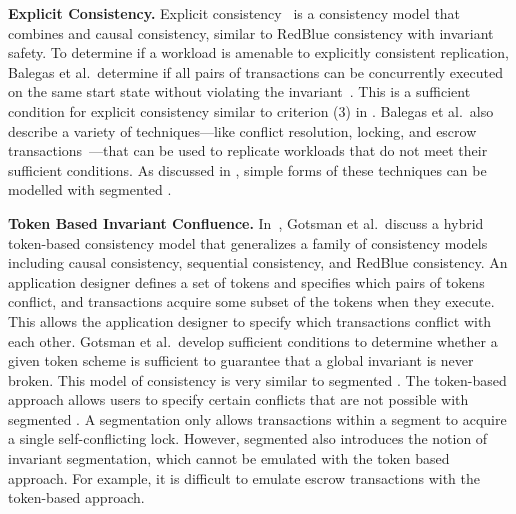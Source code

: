 \textbf{Explicit Consistency.}
Explicit consistency~\cite{balegas2015towards} is a consistency model that
combines \invariantconfluence{} and causal consistency, similar to RedBlue
consistency with invariant safety. To determine if a workload is amenable to
explicitly consistent replication, Balegas et al.\ determine if all pairs of
transactions can be concurrently executed on the same start state without
violating the invariant~\cite{balegas2015towards}.  This is a sufficient
condition for explicit consistency similar to criterion (3) in
. Balegas et al.\ also describe a variety of
techniques---like conflict resolution, locking, and escrow
transactions~\cite{o1986escrow}---that can be used to replicate workloads that
do not meet their sufficient conditions. As discussed in ,
simple forms of these techniques can be modelled with segmented
\invariantconfluence{}.

\textbf{Token Based Invariant Confluence.}
In~\cite{gotsman2016cause}, Gotsman et al.\ discuss a hybrid token-based
consistency model that generalizes a family of consistency models including
causal consistency, sequential consistency, and RedBlue consistency. An
application designer defines a set of tokens and specifies which pairs of
tokens conflict, and transactions acquire some subset of the tokens when they
execute. This allows the application designer to specify which transactions
conflict with each other.
%
%
Gotsman et al.\ develop sufficient conditions to determine whether a given
token scheme is sufficient to guarantee that a global invariant is never
broken. This model of consistency is very similar to segmented
\invariantconfluence{}. The token-based approach allows users to specify certain
conflicts that are not possible with segmented \invariantconfluence{}. A
segmentation only allows transactions within a segment to acquire a single
self-conflicting lock. However, segmented \invariantconfluence{} also introduces
the notion of invariant segmentation, which cannot be emulated with the token
based approach. For example, it is difficult to emulate escrow transactions
with the token-based approach.

